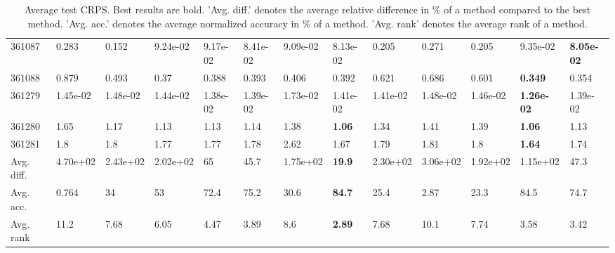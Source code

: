 \begin{table}[ht!]
\begin{tabular}{lllllllllllll}
  361087 & 0.283 & 0.152 & 9.24e-02 & 9.17e-02 & 8.41e-02 & 9.09e-02 & 8.13e-02 & 0.205 & 0.271 & 0.205 & 9.35e-02 & \textbf{8.05e-02} \\ 
  361088 & 0.879 & 0.493 & 0.37 & 0.388 & 0.393 & 0.406 & 0.392 & 0.621 & 0.686 & 0.601 & \textbf{0.349} & 0.354 \\ 
  361279 & 1.45e-02 & 1.48e-02 & 1.44e-02 & 1.38e-02 & 1.39e-02 & 1.73e-02 & 1.41e-02 & 1.41e-02 & 1.48e-02 & 1.46e-02 & \textbf{1.26e-02} & 1.39e-02 \\ 
  361280 & 1.65 & 1.17 & 1.13 & 1.13 & 1.14 & 1.38 & \textbf{1.06} & 1.34 & 1.41 & 1.39 & \textbf{1.06} & 1.13 \\ 
  361281 & 1.8 & 1.8 & 1.77 & 1.77 & 1.78 & 2.62 & 1.67 & 1.79 & 1.81 & 1.8 & \textbf{1.64} & 1.74 \\ 
   \hline
Avg. diff. & 4.70e+02 & 2.43e+02 & 2.02e+02 & 65 & 45.7 & 1.75e+02 & \textbf{19.9} & 2.30e+02 & 3.06e+02 & 1.92e+02 & 1.15e+02 & 47.3 \\ 
  Avg. acc. & 0.764 & 34 & 53 & 72.4 & 75.2 & 30.6 & \textbf{84.7} & 25.4 & 2.87 & 23.3 & 84.5 & 74.7 \\ 
  Avg. rank & 11.2 & 7.68 & 6.05 & 4.47 & 3.89 & 8.6 & \textbf{2.89} & 7.68 & 10.1 & 7.74 & 3.58 & 3.42 \\ 
   \hline
\hline
\end{tabular}
\endgroup
\caption{Average test CRPS. 
                  Best results are bold. 
                  'Avg. diff.' denotes the average relative difference in \% of a method compared to the best method.
                  'Avg. acc.' denotes the average normalized accuracy in \% of a method.
                  'Avg. rank' denotes the average rank of a method.} 
\label{TABLES/table_results_CRPS_umap}
\end{table}
